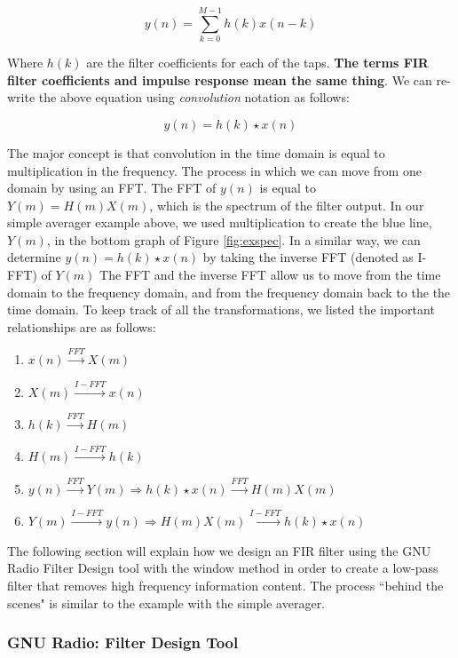 $$y(n) = \sum_{k=0}^{M-1}  h(k)x(n-k)$$

Where $h(k)$ are the filter coefficients for each of the taps.  \textbf{The terms FIR filter coefficients and impulse response mean the same thing}\cite{lyons:intro}.  We can re-write the above equation using \textit{convolution} notation as follows: 

$$y(n) = h(k) \star x(n)$$  

The major concept is that convolution in the time domain is equal to multiplication in the frequency.  The process in which we can move from one domain by using an FFT.  The FFT of $y(n)$ is equal to $Y(m) = H(m) X(m)$, which is the spectrum of the filter output.  In our simple averager example above, we used multiplication to create the blue line, $Y(m)$, in the bottom graph of Figure \ref{fig:exspec}.  In a similar way, we can determine $y(n) = h(k)\star x(n)$ by taking the inverse FFT (denoted as I-FFT) of $Y(m)$ \cite{lyons:intro}  The FFT and the inverse FFT allow us to move from the time domain to the frequency domain, and from the frequency domain back to the the time domain.  To keep track of all the transformations, we listed the important relationships are as follows: \\

\begin{enumerate}
\item $x(n) \overset{FFT}{\longrightarrow} X(m)$
\item $X(m) \overset{I-FFT}{\longrightarrow} x(n)$
\item $h(k) \overset{FFT}{\longrightarrow} H(m)$
\item $H(m) \overset{I-FFT}{\longrightarrow} h(k)$
\item $y(n) \overset{FFT}{\longrightarrow} Y(m) \Rightarrow h(k)\star x(n) \overset{FFT}{\longrightarrow} H(m) X(m)$
\item $Y(m) \overset{I-FFT}{\longrightarrow} y(n) \Rightarrow H(m) X(m) \overset{I-FFT}{\longrightarrow} h(k)\star x(n)$\\
\end{enumerate}    

The following section will explain how we design an FIR filter using the GNU Radio Filter Design tool with the window method in order to create a low-pass filter that removes high frequency information content.  The process ``behind the scenes" is similar to the example with the simple averager.  

\subsubsection{GNU Radio: Filter Design Tool}

